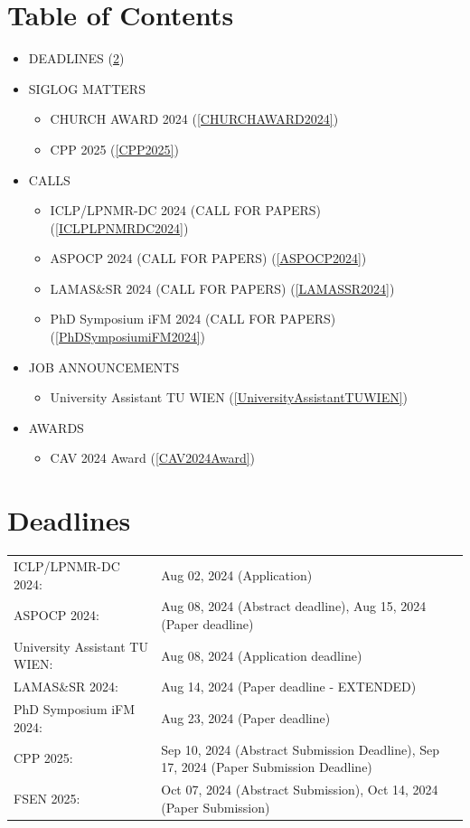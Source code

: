 \documentclass[prodmode,acmtecs]{acmsmall} %
\begin{document}
\section{Table of Contents}\begin{itemize}\item DEADLINES (\cref{deadlines}) 
 
\item SIGLOG MATTERS 
 
\begin{itemize}\item CHURCH AWARD 2024 (\cref{CHURCHAWARD2024})
\item CPP 2025 (\cref{CPP2025})
\end{itemize} 
\item CALLS 
 
\begin{itemize}\item ICLP/LPNMR-DC 2024 (CALL FOR PAPERS) (\cref{ICLPLPNMRDC2024})
\item ASPOCP 2024 (CALL FOR PAPERS) (\cref{ASPOCP2024})
\item LAMAS\&SR 2024 (CALL FOR PAPERS) (\cref{LAMASSR2024})
\item PhD Symposium iFM 2024 (CALL FOR PAPERS) (\cref{PhDSymposiumiFM2024})
\end{itemize} 
\item JOB ANNOUNCEMENTS 
 
\begin{itemize}\item University Assistant TU WIEN (\cref{UniversityAssistantTUWIEN})
\end{itemize} 
\item AWARDS 
 
\begin{itemize}\item CAV 2024 Award (\cref{CAV2024Award})
\end{itemize} 
\end{itemize}\section{Deadlines}\label{deadlines}\begin{tabulary}{\linewidth}{LL}ICLP/LPNMR-DC 2024:  & Aug 02, 2024 (Application) \\
ASPOCP 2024:  & Aug 08, 2024 (Abstract  deadline), Aug 15, 2024 (Paper  deadline) \\
University Assistant TU WIEN:  & Aug 08, 2024 (Application deadline) \\
LAMAS\&SR 2024:  & Aug 14, 2024 (Paper  deadline - EXTENDED) \\
PhD Symposium iFM 2024:  & Aug 23, 2024 (Paper  deadline) \\
CPP 2025:  & Sep 10, 2024 (Abstract Submission Deadline), Sep 17, 2024 (Paper Submission Deadline) \\
FSEN 2025:  & Oct 07, 2024 (Abstract Submission), Oct 14, 2024 (Paper Submission) \\
\end{tabulary}
\end{document}

